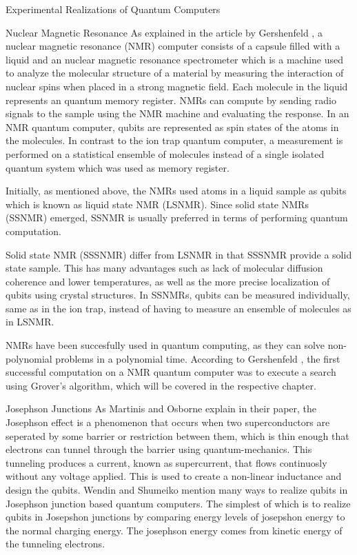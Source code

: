\documentclass[aps,preprintnumbers,twocolumn]{revtex4}
\begin{document}
\begin{section}{Experimental Realizations of Quantum Computers}
\begin{subsection}{Nuclear Magnetic Resonance}
As explained in the article by Gershenfeld \cite{Gershenfeld1998QuantumCW}, a nuclear magnetic resonance (NMR) computer consists of a capsule filled with a liquid and an nuclear magnetic resonance spectrometer which is a machine used to analyze the molecular structure of a material by measuring the interaction of nuclear spins when placed in a strong magnetic field.
Each molecule in the liquid represents an quantum memory register. 
NMRs can compute by sending radio signals to the sample using the NMR machine and evaluating the response. 
In an NMR quantum computer, qubits are represented as spin states of the atoms in the molecules. 
In contrast to the ion trap quantum computer, 
a measurement is performed on a statistical ensemble of molecules instead of a single isolated quantum system which was used as memory register. 

Initially, as mentioned above, the NMRs used atoms in a liquid sample as qubits which is known as liquid state NMR (LSNMR). 
Since solid state NMRs (SSNMR) emerged, SSNMR is usually preferred in terms of performing quantum computation.

Solid state NMR (SSSNMR) differ from LSNMR in that SSSNMR provide a solid state sample.
This has many advantages such as lack of molecular diffusion coherence and lower temperatures, as well as the more precise localization of qubits using crystal structures.
In SSNMRs, qubits can be measured individually, same as in the ion trap,
instead of having to measure an ensemble of molecules as in LSNMR. 

NMRs have been succesfully used in quantum computing, as they can solve non-polynomial problems in a polynomial time.
According to Gershenfeld \cite{Gershenfeld1998QuantumCW}, the first successful computation on a NMR quantum computer was to execute a search using Grover's algorithm, 
which will be covered in the respective chapter. 
\end{subsection}

\begin{subsection}{Josephson Junctions}
As Martinis and Osborne explain in their paper, 
the Josephson effect is a phenomenon that occurs when two superconductors are seperated 
by some barrier or restriction between them, which is thin enough that electrons can tunnel through the barrier using quantum-mechanics. 
This tunneling produces a current, known as supercurrent, that flows continuosly without any voltage applied. 
This is used to create a non-linear inductance and design the qubits. 
Wendin and Shumeiko mention \cite{shumeiko} many ways to realize qubits in Josephson junction based quantum computers. 
The simplest of which is to realize qubits in Josepshon junctions by comparing energy levels of josepshon energy to the normal charging energy. 
The josephson energy comes from kinetic energy of the tunneling electrons.


\end{subsection}
\end{section}
\end{document}
